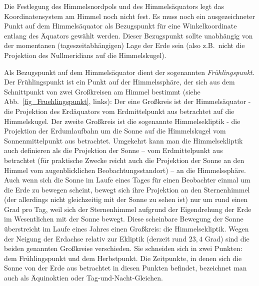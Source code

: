 Die Festlegung des Himmelsnordpols und des Himmels\"aquators legt das Koordinatensystem am
Himmel noch nicht fest. Es muss noch ein ausgezeichneter Punkt auf dem Himmels\"aquator als
Bezugspunkt f\"ur eine Winkelkoordinate entlang des \"Aquators gew\"ahlt werden. Dieser
Bezugspunkt sollte unabh\"angig von der momentanen (tageszeitabh\"angigen) Lage der Erde sein
(also z.B.\ nicht die Projektion des Nullmeridians auf die Himmelskugel). 

 Als Bezugspunkt auf dem Himmels\"aquator dient der sogenannten 
 \textit{Fr\"uhlingspunkt}. 
 Der Fr\"uhlingspunkt ist ein Punkt auf der Himmelssph\"are, der sich aus
dem Schnittpunkt von zwei Gro\ss kreisen am Himmel bestimmt (siehe Abb.\ \ref{fig_Fruehlingspunkt}, links):
 Der eine Gro\ss kreis ist der 
 Himmels\"aquator - die Projektion des Erd\"aquators vom Erdmittelpunkt
 aus betrachtet auf die Himmelskugel. Der zweite Gro\ss kreis ist die sogenannte Himmelsekliptik - 
 die Projektion der Erdumlaufbahn um die Sonne auf die Himmelskugel
 vom Sonnenmittelpunkt aus betrachtet. Umgekehrt kann man die Himmels\-ekliptik auch
 definieren als die Projektion der Sonne -- vom Erdmittelpunkt aus betrachtet (f\"ur praktische Zwecke 
 reicht auch die Projektion der Sonne an den Himmel vom augenblicklichen Beobachtungsstandort) -- 
 an die Himmelssph\"are. Auch wenn sich die Sonne im Laufe eines Tages f\"ur
 einen Beobachter einmal um die Erde zu bewegen scheint, bewegt sich ihre Projektion an den
 Sternenhimmel (der allerdings nicht gleichzeitig mit der Sonne zu sehen ist) nur um rund einen
 Grad pro Tag, weil sich der Sternenhimmel aufgrund der Eigendrehung der Erde im Wesentlichen 
 mit der Sonne bewegt. 
 Diese scheinbare Bewegung der Sonne \"uberstreicht im Laufe eines Jahres einen Gro\ss kreis:
 die Himmelsekliptik. Wegen der Neigung der Erdachse relativ zur Ekliptik (derzeit rund $23,4$ Grad) sind die
 beiden genannten Gro\ss kreise verschieden. Sie schneiden sich in zwei Punkten: dem
 Fr\"uhlingspunkt und dem Herbstpunkt. 
 Die Zeitpunkte, in denen sich die Sonne von
 der Erde aus betrachtet in diesen Punkten befindet, bezeichnet man auch als \"Aquinoktien oder
 Tag-und-Nacht-Gleichen. 

